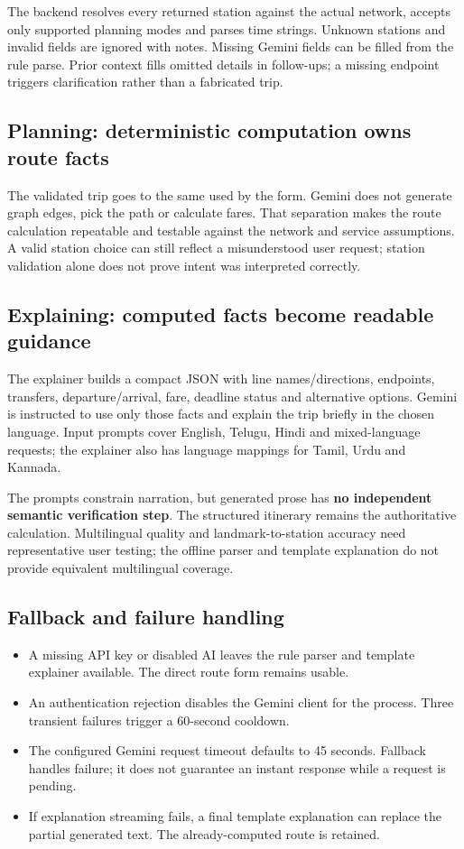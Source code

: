 \documentclass[10pt,a4paper]{article}
\newcommand{\code}[1]{\texttt{\small\detokenize{#1}}}
\begin{document}
The backend resolves every returned station against the actual network, accepts only supported planning modes and parses time strings. Unknown stations and invalid fields are ignored with notes. Missing Gemini fields can be filled from the rule parse. Prior context fills omitted details in follow-ups; a missing endpoint triggers clarification rather than a fabricated trip.

\subsection{Planning: deterministic computation owns route facts}
The validated trip goes to the same \code{RoutePlanner} used by the form. Gemini does not generate graph edges, pick the path or calculate fares. That separation makes the route calculation repeatable and testable against the network and service assumptions. A valid station choice can still reflect a misunderstood user request; station validation alone does not prove intent was interpreted correctly.

\subsection{Explaining: computed facts become readable guidance}
The explainer builds a compact JSON with line names/directions, endpoints, transfers, departure/arrival, fare, deadline status and alternative options. Gemini is instructed to use only those facts and explain the trip briefly in the chosen language. Input prompts cover English, Telugu, Hindi and mixed-language requests; the explainer also has language mappings for Tamil, Urdu and Kannada.

The prompts constrain narration, but generated prose has \textbf{no independent semantic verification step}. The structured itinerary remains the authoritative calculation. Multilingual quality and landmark-to-station accuracy need representative user testing; the offline parser and template explanation do not provide equivalent multilingual coverage.

\subsection{Fallback and failure handling}
\begin{itemize}
\item A missing API key or disabled AI leaves the rule parser and template explainer available. The direct route form remains usable.
\item An authentication rejection disables the Gemini client for the process. Three transient failures trigger a 60-second cooldown.
\item The configured Gemini request timeout defaults to 45 seconds. Fallback handles failure; it does not guarantee an instant response while a request is pending.
\item If explanation streaming fails, a final template explanation can replace the partial generated text. The already-computed route is retained.
\end{itemize}
\end{document}
